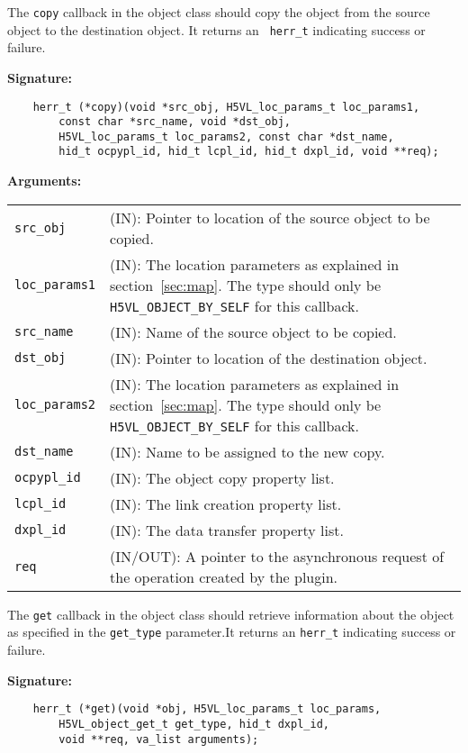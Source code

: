 The {\tt copy} callback in the object class should copy the object
from the source object to the destination object. It returns an {\tt
  herr\_t} indicating success or failure.

\textbf{Signature:}
\begin{lstlisting}
    herr_t (*copy)(void *src_obj, H5VL_loc_params_t loc_params1, 
        const char *src_name, void *dst_obj, 
        H5VL_loc_params_t loc_params2, const char *dst_name,
        hid_t ocpypl_id, hid_t lcpl_id, hid_t dxpl_id, void **req);
\end{lstlisting}

\textbf{Arguments:}\\
\begin{tabular}{l p{10cm}}
  {\tt src\_obj} & (IN): Pointer to location of the source object to
  be copied.\\
  {\tt loc\_params1} & (IN): The location parameters as explained in
  section~\ref{sec:map}. The type should only be {\tt
    H5VL\_OBJECT\_BY\_SELF} for this callback.\\
  {\tt src\_name} & (IN): Name of the source object to
  be copied.\\
  {\tt dst\_obj} & (IN): Pointer to location of the destination
  object.\\
  {\tt loc\_params2} & (IN): The location parameters as explained in
  section~\ref{sec:map}. The type should only be {\tt
    H5VL\_OBJECT\_BY\_SELF} for this callback.\\
  {\tt dst\_name} & (IN): Name to be assigned to the new copy.\\
  {\tt ocpypl\_id} & (IN): The object copy property list.\\
  {\tt lcpl\_id} & (IN): The link creation property list.\\
  {\tt dxpl\_id} & (IN): The data transfer property list.\\
  {\tt req} & (IN/OUT): A pointer to the asynchronous request of the
  operation created by the plugin.\\
\end{tabular}

The {\tt get} callback in the object class should retrieve information
about the object as specified in the {\tt get\_type} parameter.It
returns an {\tt herr\_t} indicating success or failure.

\textbf{Signature:}
\begin{lstlisting}
    herr_t (*get)(void *obj, H5VL_loc_params_t loc_params, 
        H5VL_object_get_t get_type, hid_t dxpl_id, 
        void **req, va_list arguments);
\end{lstlisting}

